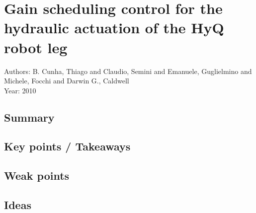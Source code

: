 \section{Gain scheduling control for the hydraulic actuation of the HyQ robot leg}
Authors: B. Cunha, Thiago and Claudio, Semini and Emanuele, Guglielmino and Michele, Focchi and Darwin G., Caldwell\\
Year: 2010
\subsection*{Summary}
\subsection*{Key points / Takeaways}
\subsection*{Weak points}
\subsection*{Ideas}
